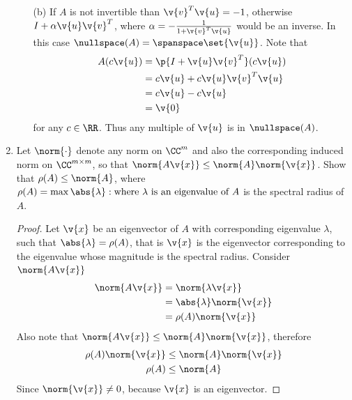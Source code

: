 \documentclass[11pt]{article}
\begin{document}
\begin{enumerate}
\begin{enumerate}
            \item[(b)]
                If $A$ is not invertible than $\v{v}^T \v{u} = -1$, otherwise
                $I + \alpha \v{u}\v{v}^T$, where
                $\alpha = -\frac{1}{1 + \v{v}^T\v{u}}$ would be an inverse.
                In this case $\nullspace(A) = \spanspace\set{\v{u}}$.
                Note that
                \begin{align*}
                    A(c\v{u}) &= \p{I + \v{u}\v{v}^T}(c\v{u}) \\
                            &= c\v{u} + c\v{u}\v{v}^T\v{u} \\
                            &= c\v{u} - c\v{u} \\
                            &= \v{0}
                \end{align*}
                for any $c \in \RR$.
                Thus any multiple of $\v{u}$ is in $\nullspace(A)$.
        \end{enumerate}

    \item %
        Let $\norm{\cdot}$ denote any norm on $\CC^m$ and also the corresponding
        induced norm on $\CC^{m \times m}$, so that
        $\norm{A\v{x}} \le \norm{A}\norm{\v{x}}$.
        Show that $\rho(A) \le \norm{A}$, where
        $\rho(A) = \max{\abs{\lambda}:\text{where $\lambda$ is an eigenvalue of $A$}}$
        is the spectral radius of $A$.

        \begin{proof}
            Let $\v{x}$ be an eigenvector of $A$ with corresponding eigenvalue
            $\lambda$, such that $\abs{\lambda} = \rho(A)$, that is $\v{x}$ is
            the eigenvector corresponding to the eigenvalue whose magnitude is
            the spectral radius.
            Consider $\norm{A\v{x}}$
            \begin{align*}
                \norm{A\v{x}} &= \norm{\lambda \v{x}} \\
                &= \abs{\lambda} \norm{\v{x}} \\
                &= \rho(A) \norm{\v{x}}
            \end{align*}
            Also note that $\norm{A\v{x}} \le \norm{A}\norm{\v{x}}$, therefore
            \begin{align*}
                \rho(A) \norm{\v{x}} &\le \norm{A}\norm{\v{x}} \\
                \rho(A) &\le \norm{A}
            \end{align*}
            Since $\norm{\v{x}} \neq 0$, because $\v{x}$ is an eigenvector.
        \end{proof}


\end{enumerate}
\end{document}
